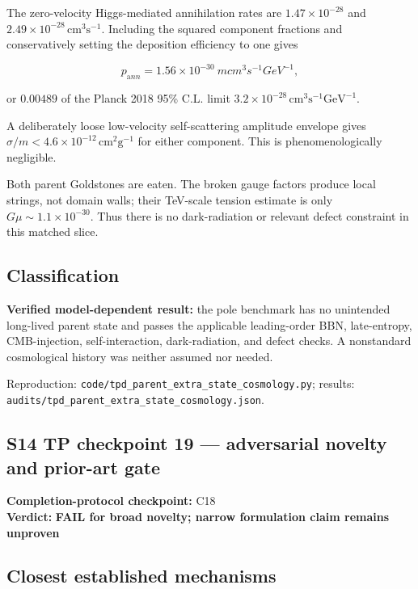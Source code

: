 \documentclass[
]{article}
\begin{document}
The zero-velocity Higgs-mediated annihilation rates are
\(1.47\times10^{-28}\) and \(2.49\times10^{-28}\,\mathrm{cm^3s^{-1}}\).
Including the squared component fractions and conservatively setting the
deposition efficiency to one gives

\[
p_{\mathrm ann}=1.56\times10^{-30}\ {
m cm^3s^{-1}GeV^{-1}},
\]

or \(0.00489\) of the Planck 2018 95\% C.L. limit
\(3.2\times10^{-28}\,\mathrm{cm^3s^{-1}GeV^{-1}}\).

A deliberately loose low-velocity self-scattering amplitude envelope
gives \(\sigma/m<4.6\times10^{-12}\,\mathrm{cm^2g^{-1}}\) for either
component. This is phenomenologically negligible.

Both parent Goldstones are eaten. The broken gauge factors produce local
strings, not domain walls; their TeV-scale tension estimate is only
\(G\mu\sim1.1\times10^{-30}\). Thus there is no dark-radiation or
relevant defect constraint in this matched slice.

\hypertarget{classification}{%
\subsection{Classification}\label{classification}}

\textbf{Verified model-dependent result:} the pole benchmark has no
unintended long-lived parent state and passes the applicable
leading-order BBN, late-entropy, CMB-injection, self-interaction,
dark-radiation, and defect checks. A nonstandard cosmological history
was neither assumed nor needed.

Reproduction: \texttt{code/tpd\_parent\_extra\_state\_cosmology.py};
results: \texttt{audits/tpd\_parent\_extra\_state\_cosmology.json}.

\newpage

\hypertarget{s14-tp-checkpoint-19-adversarial-novelty-and-prior-art-gate}{%
\subsection{S14 TP checkpoint 19 --- adversarial novelty and prior-art
gate}\label{s14-tp-checkpoint-19-adversarial-novelty-and-prior-art-gate}}

\textbf{Completion-protocol checkpoint:} C18\\
\textbf{Verdict:} \textbf{FAIL for broad novelty; narrow formulation
claim remains unproven}

\hypertarget{closest-established-mechanisms}{%
\subsection{Closest established
mechanisms}\label{closest-established-mechanisms}}
\end{document}

